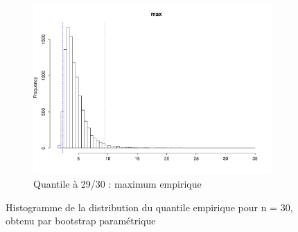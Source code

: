 \documentclass{article}
\renewcommand*{\(}{ \left( }
\renewcommand*{\)}{ \right) }
\begin{document}
\begin{figure}[H]
\begin{subfigure}[t]{0.3\textwidth}
        \includegraphics[width = \linewidth]{img/BootstrapParamEMV-Max-30.pdf}
        \caption{Quantile à 29/30 : maximum empirique}
        \label{fig:BPEMVMax}
    \end{subfigure}%
    \caption{Histogramme de la distribution du quantile empirique pour n = 30, obtenu par bootstrap paramétrique}
    \label{fig:BPEMV}
\end{figure}
\end{document}
